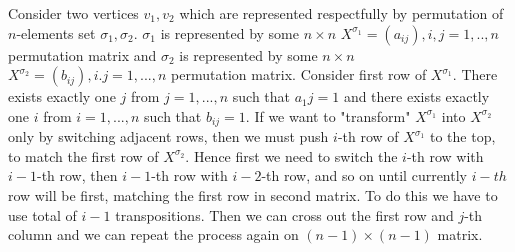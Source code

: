 \documentclass[11pt]{article}
\theoremstyle{plain}
\theoremstyle{definition}
\begin{document}
Consider two vertices $v_1,v_2$ which are represented respectfully by  permutation of $n$-elements set $\sigma_1,\sigma_2$. $\sigma_1$ is represented by some $n \times n$ $X^{\sigma_1}= (a_{ij}), i,j=1,..,n$ permutation matrix and $\sigma_2$ is represented by some $n \times n$ 
$X^{\sigma_2} = (b_{ij}), i.j=1,...,n$ permutation matrix.
Consider first row of $X^{\sigma_1}$. There exists exactly one $j$ from $j=1,...,n$ such that $a_1j = 1$ and there exists exactly one $i$ from $i = 1,...,n$ such that $b_{ij} = 1$. If we want to "transform" $X^{\sigma_1}$ into $X^{\sigma_2}$ only by switching adjacent rows, then we must push $i$-th row of $X^{\sigma_1}$ to the top, to match the first row of $X^{\sigma_2}$. Hence first we need to switch the $i$-th row with $i-1$-th row, then $i-1$-th row with $i-2$-th row, and so on until currently $i-th$ row will be first, matching the first row in second matrix. To do this we have to use total of $i-1$ transpositions. Then we can cross out the first row and $j$-th column and we can repeat the process again on $(n-1) \times (n-1)$ matrix. 
\end{document}
